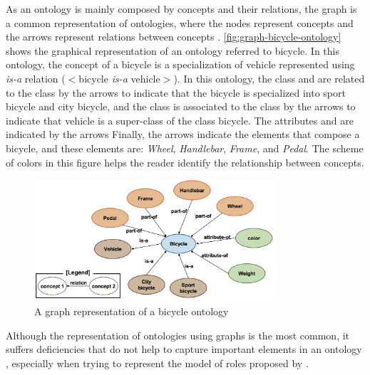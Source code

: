 As an ontology is mainly composed by concepts and their relations, the graph is a common representation of ontologies, where the nodes represent concepts and the arrows represent relations between concepts \cite{DiengHug1998}. \autoref{fig:graph-bicycle-ontology} shows the graphical representation of an ontology referred to bicycle. In this ontology, the concept of a bicycle is a specialization of vehicle represented using \emph{is-a} relation ($<$bicycle \emph{is-a} vehicle$>$). In this ontology, the class  and  are related to the class  by the arrows  to indicate that the bicycle is specialized into sport bicycle and city bicycle, and the class  is associated to the class  by the arrows  to indicate that vehicle is a super-class of the class bicycle. The attributes  and  are indicated by the arrows  Finally, the arrows  indicate the elements that compose a bicycle, and these elements are: \emph{Wheel}, \emph{Handlebar}, \emph{Frame}, and \emph{Pedal}. The scheme of colors in this figure helps the reader identify the relationship between concepts.

\begin{figure}[htb]
 \caption{A graph representation of a bicycle ontology}
 \label{fig:graph-bicycle-ontology}
 \centering
 \includegraphics[width=0.8\textwidth]{images/chap-general-background/graph-bicycle-ontology.png}
\end{figure}

Although the representation of ontologies using graphs is the most common, it suffers deficiencies that do not help to capture important elements in an ontology \cite{Devedzic2006}, especially when trying to represent the model of roles proposed by . 

